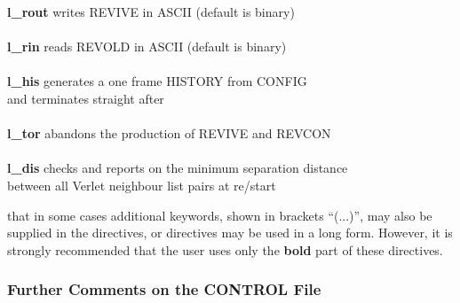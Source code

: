 \begin{tabbing}
\> {\bf l\_rout}                                \> writes REVIVE in ASCII (default is binary) \\
\>                                              \> \\
\> {\bf l\_rin}                                 \> reads REVOLD in ASCII (default is binary) \\
\>                                              \> \\
\> {\bf l\_his}                                 \> generates a one frame HISTORY from CONFIG \\
\>                                              \> and terminates straight after \\
\>                                              \> \\
\> {\bf l\_tor}                                 \> abandons the production of REVIVE and REVCON \\
\>                                              \> \\
\> {\bf l\_dis}                                 \> checks and reports on the minimum separation distance \\
\>                                              \> between all Verlet neighbour list pairs at re/start
\end{tabbing}

 that in some cases additional keywords, shown in
brackets ``(...)'', may also be supplied in the directives, or
directives may be used in a long form.  However, it is strongly
recommended that the user uses only the {\bf bold} part of these
directives.

\begin{table}[htbp]
\end{table}

\subsubsection{Further Comments on the CONTROL File}

